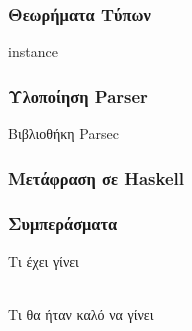\documentclass{beamer}
\def\e{\foreignlanguage{english}}
\def\h{\e{Haskell}}
\begin{document}
\begin{frame}

\frametitle{Θεωρήματα Τύπων}

\e{instance}

\end{frame}

\begin{frame}

\frametitle{Υλοποίηση \e{Parser}}

Βιβλιοθήκη \e{Parsec}

\end{frame}

\begin{frame}

\frametitle{Μετάφραση σε \h}

\end{frame}

\begin{frame}

\frametitle{Συμπεράσματα}

Τι έχει γίνει
\\~\

Τι θα ήταν καλό να γίνει

\end{frame}
\end{document}
